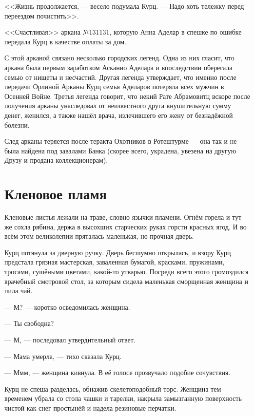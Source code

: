 <<Жизнь продолжается, --- весело подумала Курц.
--- Надо хоть тележку перед переездом почистить>>.


\newpage
\thispagestyle{plain}

<<Счастливая>> аркана №131131, которую Анна Аделар в спешке по ошибке передала Курц в качестве оплаты за дом.

С этой арканой связано несколько городских легенд.
Одна из них гласит, что аркана была первым заработком Асканио Аделара и впоследствии оберегала семью от нищеты и несчастий.
Другая легенда утверждает, что именно после передачи Орлиной Арканы Курц семья Аделаров потеряла всех мужчин в Осенней Войне.
Третья легенда говорит, что некий Рате Абрамовитц вскоре после получения арканы унаследовал от неизвестного друга внушительную сумму денег, женился, а также нашёл врача, излечившего его жену от безнадёжной болезни.

След арканы теряется после теракта Охотников в Ротештурме --- она так и не была найдена под завалами Банка (скорее всего, украдена, увезена на другую Друзу и продана коллекционерам).

\newpage
\section{Кленовое пламя}

Кленовые листья лежали на траве, словно язычки пламени.
Огнём горела и тут же сохла рябина, держа в высохших старческих руках горсти красных ягод.
И во всём этом великолепии пряталась маленькая, но прочная дверь.

Курц потянула за дверную ручку.
Дверь бесшумно открылась, и взору Курц предстала грязная мастерская, заваленная бумагой, красками, пружинами, тросами, сушёными цветами, какой-то утварью.
Посреди всего этого громоздился врачебный смотровой стол, за которым сидела маленькая сморщенная женщина и пила чай.

--- М? --- коротко осведомилась женщина.

--- Ты свободна?

--- М, --- последовал утвердительный ответ.

--- Мама умерла, --- тихо сказала Курц.

--- Ммм, --- женщина кивнула.
В её голосе прозвучало подобие сочувствия.

Курц не спеша разделась, обнажив скелетоподобный торс.
Женщина тем временем убрала со стола чашки и тарелки, накрыла замызганную поверхность чистой как снег простынёй и надела резиновые перчатки.

